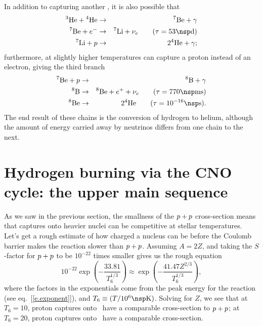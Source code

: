 In addition to capturing another \helium[3], it is also possible that
\begin{eqnarray}
\helium[3] + \helium &\to& \beryllium[7] + \gamma\nonumber\\
 \beryllium[7] + e^{-} &\to& \lithium[7] +  \nu_{e}\qquad(\tau=53\nsp\unitstyle{d})\nonumber \\
 \lithium[7] + \pt &\to& 2\helium + \gamma;
 \end{eqnarray}
furthermore, at slightly higher temperatures \beryllium[7] can capture a proton instead of an electron, giving the third branch
\begin{eqnarray}
\beryllium[7] + \pt &\to& \boron[8] + \gamma\nonumber\\
\boron[8] &\to& \beryllium[8] + e^{+} + \nu_{e}\qquad(\tau = 770\nsp\milli\second)\nonumber\\
\beryllium[8] &\to& 2\helium\qquad(\tau=10^{-16}\nsp\second).
\end{eqnarray}
 The end result of these chains is the conversion of hydrogen to helium, although the amount of energy carried away by neutrinos differs from one chain to the next.

\section[The CNO cycle]{Hydrogen burning via the CNO cycle: the upper main sequence}
\label{s.upper-ms}

As we saw in the previous section, the smallness of the $p+p$ cross-section means that captures onto heavier nuclei can be competitive at stellar temperatures.  Let's get a rough estimate of how charged a nucleus can be before the Coulomb barrier makes the reaction slower than $p+p$.  Assuming $A = 2Z$, and taking the $S$-factor for $p+p$ to be $10^{-22}$ times smaller gives us the rough equation
\[ 10^{-22}\exp\left(-\frac{33.81}{T_{6}^{1/3}}\right) \approx \exp\left(-\frac{41.47 Z^{2/3}}{T_{6}^{1/3}}\right), \]
where the factors in the exponentials come from the peak energy for the reaction (see eq.~[\ref{e.exponent}]), and $T_{6}\equiv (T/10^{6}\nsp\K)$.  Solving for $Z$, we see that at $T_{6} = 10$, proton captures onto \carbon\ have a comparable cross-section to $p + p$; at $T_{6} = 20$, proton captures onto \oxygen\ have a comparable cross-section.

